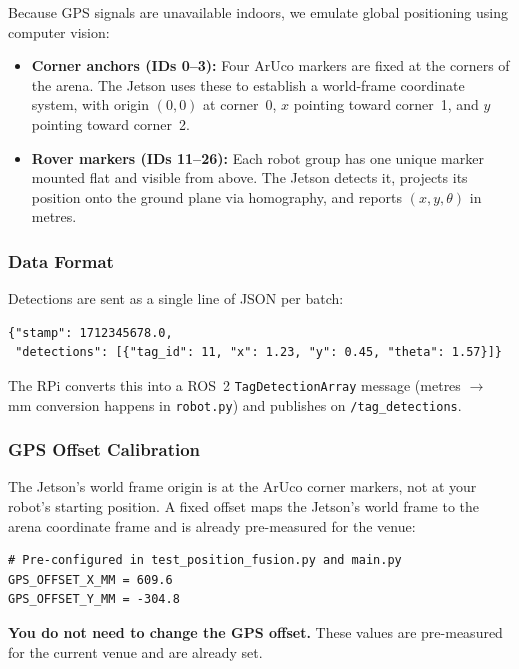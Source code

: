 \documentclass[12pt,letterpaper]{article}
\begin{document}
Because GPS signals are unavailable indoors, we emulate global positioning
using computer vision:

\begin{itemize}
  \item \textbf{Corner anchors (IDs 0--3):} Four ArUco markers are fixed at
        the corners of the arena. The Jetson uses these to establish a
        world-frame coordinate system, with origin $(0, 0)$ at corner~0,
        $x$ pointing toward corner~1, and $y$ pointing toward corner~2.

  \item \textbf{Rover markers (IDs 11--26):} Each robot group has one unique
        marker mounted flat and visible from above.
        The Jetson detects it, projects its position onto the ground plane via
        homography, and reports $(x, y, \theta)$ in metres.
\end{itemize}

\subsubsection*{Data Format}

Detections are sent as a single line of JSON per batch:
\begin{lstlisting}[style=json, caption={GPS message format (one line per batch)}]
{"stamp": 1712345678.0,
 "detections": [{"tag_id": 11, "x": 1.23, "y": 0.45, "theta": 1.57}]}
\end{lstlisting}

The RPi converts this into a ROS~2 \texttt{TagDetectionArray} message
(metres $\to$ mm conversion happens in \texttt{robot.py}) and publishes on
\texttt{/tag\_detections}.

\subsubsection*{GPS Offset Calibration}

The Jetson's world frame origin is at the ArUco corner markers, not at
your robot's starting position.
A fixed offset maps the Jetson's world frame to the arena coordinate frame
and is already pre-measured for the venue:

\begin{lstlisting}[style=python]
# Pre-configured in test_position_fusion.py and main.py
GPS_OFFSET_X_MM = 609.6
GPS_OFFSET_Y_MM = -304.8
\end{lstlisting}

\begin{notebox}
  \textbf{You do not need to change the GPS offset.}
  These values are pre-measured for the current venue and are already set.
\end{notebox}
\end{document}
